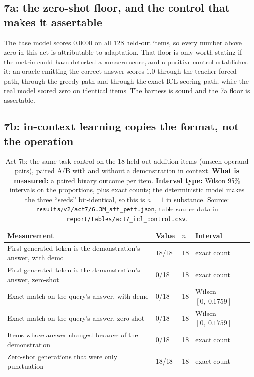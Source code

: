 \documentclass[11pt,a4paper]{article}
\begin{document}
\subsection{7a: the zero-shot floor, and the control that makes it assertable}
\label{sec:act7a}

The base model scores 0.0000 on all 128 held-out items, so every number above
zero in this act is attributable to adaptation. That floor is only worth
stating if the metric could have detected a nonzero score, and a positive
control establishes it: an oracle emitting the correct answer scores 1.0
through the teacher-forced path, through the greedy path and through the exact
ICL scoring path, while the real model scored zero on identical items. The
harness is sound and the 7a floor is assertable. %


\subsection{7b: in-context learning copies the format, not the operation}
\label{sec:act7b}

\begin{table}[H]
\centering
\begin{tabular}{L{6.6cm}R{2.6cm}R{1.5cm}L{3.5cm}}
\toprule
Measurement & Value & $n$ & Interval \\
\midrule
First generated token is the demonstration's answer, with demo & 18/18 & 18 & exact count \\
First generated token is the demonstration's answer, zero-shot & 0/18 & 18 & exact count \\
Exact match on the query's answer, with demo & 0/18 & 18 & Wilson $[0,\ 0.1759]$ \\
Exact match on the query's answer, zero-shot & 0/18 & 18 & Wilson $[0,\ 0.1759]$ \\
Items whose answer changed because of the demonstration & 0/18 & 18 & exact count \\
Zero-shot generations that were only punctuation & 18/18 & 18 & exact count \\
\bottomrule
\end{tabular}
\caption{Act 7b: the same-task control on the 18 held-out addition items (unseen
operand pairs), paired A/B with and without a demonstration in context.
\textbf{What is measured:} a paired binary outcome per item. \textbf{Interval
type:} Wilson 95\% intervals on the proportions, plus exact counts; the
deterministic model makes the three ``seeds'' bit-identical, so this is $n = 1$
in substance. Source: \texttt{results/v2/act7/6.3M\_sft\_peft.json}; table
source data in \texttt{report/tables/act7\_icl\_control.csv}.}
\label{tab:act7b}
\end{table}
\end{document}
